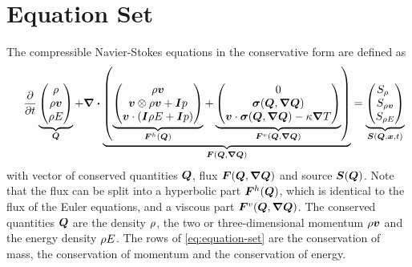 \documentclass[runningheads]{llncs}
\newcommand{\eqA}{}
\newcommand{\eqB}{(}
\newcommand{\eqMultiA}{(}
\newcommand{\eqMultiB}{)}
\DeclareRobustCommand{\pcrefSingle}[1]{%
\begingroup%
  \renewcommand{\eqA}{(}\renewcommand{\eqB}{}%
\cref{#1}%
\endgroup%
}
\DeclareRobustCommand{\pcrefMulti}[1]{%
\begingroup%
    \renewcommand{\eqMultiA}{}\renewcommand{\eqMultiB}{}%
    (\cref{#1})%
\endgroup%
}
\DeclareRobustCommand{\pcref}[1]{%
\IfSubStr{#1}{,}{\pcrefMulti{#1}}{\pcrefSingle{#1}}%
}
\begin{document}
\section{Equation Set}
\newcommand{\diffCoeff}{\varepsilon}%
\newcommand{\hyperFluxDef}{
  \begin{pmatrix}
    \Qj \\
    \Qv  \otimes \Qj + \bm{I} \pressure  \\
    \Qv \cdot (\bm{I} \QE + \bm{I} \pressure)
  \end{pmatrix}
}%
\newcommand{\viscFluxDef}{
  \begin{pmatrix}
    0\\
     \stressT (\Q, \gradQ)  \\
     \Qv \cdot \stressT (\Q, \gradQ) - \kappa \gradient{T}
   \end{pmatrix}
}%
The compressible Navier-Stokes equations in the conservative form are defined as%
\begin{equation}
 \label{eq:equation-set} 
\quad
  \pdv{}{t}
  \underbrace{
  \begin{pmatrix}
    \Qrho\\
    \Qj\\
    \QE
    \end{pmatrix}}_{\Q}
  +
  \divergence{
  \underbrace{
  \left(
   \underbrace{\hyperFluxDef}_{\hyperFlux(\Q)}
+
\underbrace{\viscFluxDef}_{\viscFlux(\Q, \gradQ)}
  \right)}_{\flux(\Q, \gradQ)}}
 =
  \underbrace{
  \begin{pmatrix}
    \source[\Qrho\phantom{\Qrho}]\\
    \source[\Qj]\\
    \source[\QE]
    \end{pmatrix}}_{\source(\Q, \bm{x}, t)}
\end{equation}
with vector of conserved quantities $\bm{Q}$, flux $\flux(\Q, \gradQ)$ and source $\source(\Q)$.
Note that the flux can be split into a hyperbolic part $\bm{F}^{h}(\bm{Q})$,
which is identical to the flux of the Euler equations,
and a viscous part $\viscFlux(\Q, \gradQ)$.
The conserved quantities
\(\bm{Q}\)
are the density $\rho$, the two or three-dimensional momentum $\rho \bm{v}$ and the energy density $\rho E$.
The rows of \cref{eq:equation-set} are the conservation of mass, the conservation of momentum and the conservation of energy.
\end{document}
